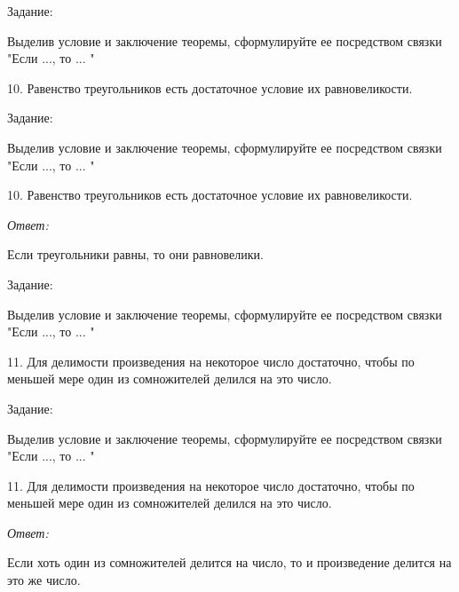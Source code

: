 \documentclass[10pt]{beamer}
\theoremstyle{remark}
\theoremstyle{definition}
\begin{document}
\begin{frame}[allowframebreaks]
\framebreak 

Задание: 

Выделив условие и заключение теоремы, сформулируйте ее посредством связки "Если ..., то ... "

10. Равенство треугольников есть достаточное условие их равновеликости.


\framebreak 

Задание: 

Выделив условие и заключение теоремы, сформулируйте ее посредством связки "Если ..., то ... "

10. Равенство треугольников есть достаточное условие их равновеликости.

\textit{Ответ:} 

Если треугольники равны, то они равновелики.

\framebreak 

Задание: 

Выделив условие и заключение теоремы, сформулируйте ее посредством связки "Если ..., то ... "

11. Для делимости произведения на некоторое число достаточно,  чтобы по меньшей мере один из сомножителей делился на это число.


\framebreak 

Задание: 

Выделив условие и заключение теоремы, сформулируйте ее посредством связки "Если ..., то ... "

11. Для делимости произведения на некоторое число достаточно,  чтобы по меньшей мере один из сомножителей делился на это число.

\textit{Ответ:} 

Если хоть один из сомножителей делится на число, то и произведение делится на это же число.


\end{frame}
\end{document}
